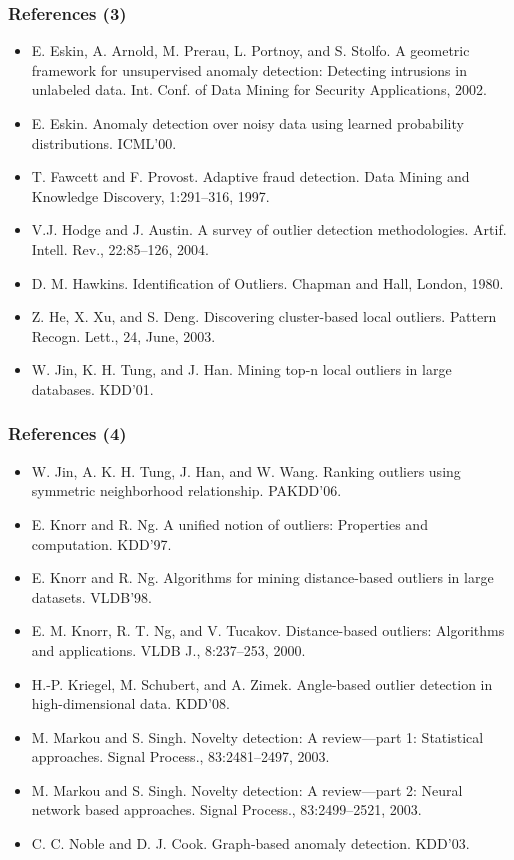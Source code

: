 \documentclass[aspectratio=169,t,xcolor=dvipsnames]{beamer}
\begin{document}
\begin{frame}
	\frametitle{References (3)}
	\begin{itemize}
		\item E. Eskin, A. Arnold, M. Prerau, L. Portnoy, and S. Stolfo. A geometric framework for unsupervised anomaly detection: Detecting intrusions in unlabeled data. Int. Conf. of Data Mining for Security Applications, 2002.
		\item E. Eskin. Anomaly detection over noisy data using learned probability distributions. ICML'00.
		\item T. Fawcett and F. Provost. Adaptive fraud detection. Data Mining and Knowledge Discovery, 1:291–316, 1997.
		\item V.J. Hodge and J. Austin. A survey of outlier detection methodologies. Artif. Intell. Rev., 22:85–126, 2004.
		\item D. M. Hawkins. Identification of Outliers. Chapman and Hall, London, 1980.
		\item Z. He, X. Xu, and S. Deng. Discovering cluster-based local outliers. Pattern Recogn. Lett., 24, June, 2003.
		\item W. Jin, K. H. Tung, and J. Han. Mining top-n local outliers in large databases. KDD'01.
	\end{itemize}
\end{frame}

\begin{frame}
	\frametitle{References (4)}
	\begin{itemize}
		\item W. Jin, A. K. H. Tung, J. Han, and W. Wang. Ranking outliers using symmetric neighborhood relationship. PAKDD'06.
		\item E. Knorr and R. Ng. A unified notion of outliers: Properties and computation. KDD'97.
		\item E. Knorr and R. Ng. Algorithms for mining distance-based outliers in large datasets. VLDB'98.
		\item E. M. Knorr, R. T. Ng, and V. Tucakov. Distance-based outliers: Algorithms and applications. VLDB J., 8:237–253, 2000.
		\item H.-P. Kriegel, M. Schubert, and A. Zimek. Angle-based outlier detection in high-dimensional data. KDD'08.
		\item M. Markou and S. Singh. Novelty detection: A review—part 1: Statistical approaches. Signal Process., 83:2481–2497, 2003.
		\item M. Markou and S. Singh. Novelty detection: A review—part 2: Neural network based approaches. Signal Process., 83:2499–2521, 2003.
		\item C. C. Noble and D. J. Cook. Graph-based anomaly detection. KDD'03.
	\end{itemize}
\end{frame}
\end{document}
